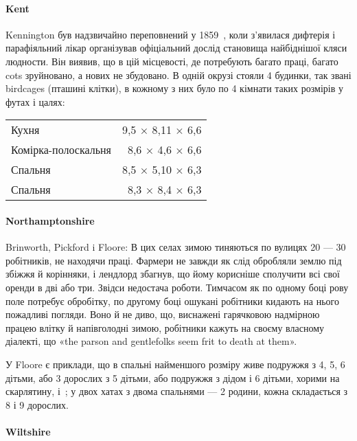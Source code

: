\paragraph{Kent}

Kennington був надзвичайно переповнений у 1859~, коли
з’явилася дифтерія і парафіяльний лікар організував офіціальний
дослід становища найбіднішої кляси людности. Він виявив, що
в цій місцевості, де потребують багато праці, багато cots зруйновано,
а нових не збудовано. В одній окрузі стояли 4 будинки,
так звані birdcages (пташині клітки), в кожному з них було по
4 кімнати таких розмірів у футах і цалях:

\begin{table}[H]
  \centering
  \begin{tabular}{lr}
    Кухня\dotfill{} & 9,5 × 8,11 × 6,6 \\
    Комірка-полоскальня & 8,6 × 4,6\phantom{0} × 6,6 \\
    Спальня\dotfill{}&8,5 × 5,10 × 6,3 \\
    Спальня\dotfill{}&8,3 × 8,4\phantom{0} × 6,3 \\
  \end{tabular}
\end{table}

\paragraph{Northamptonshire}
Brinworth, Pickford i Floore: В цих селах зимою тиняються
по вулицях 20 — 30 робітників, не находячи праці. Фармери не
завжди як слід обробляли землю під збіжжя й корінняки, і лендлорд
збагнув, що йому корисніше сполучити всі свої оренди
в дві або три. Звідси недостача роботи. Тимчасом як по одному
боці рову поле потребує обробітку, по другому боці ошукані
робітники кидають на нього пожадливі погляди. Воно й не диво,
що, виснажені гарячковою надмірною працею влітку й напівголодні
зимою, робітники кажуть на своєму власному діалекті,
що «the parson and gentlefolks seem frit to death at them».

У Floore є приклади, що в спальні найменшого розміру живе
подружжя з 4, 5, 6 дітьми, або 3 дорослих з 5 дітьми, або подружжя
з дідом і 6 дітьми, хорими на скарлятину, і~; у двох
хатах з двома спальнями — 2 родини, кожна складається з 8
і 9 дорослих.

\paragraph{Wiltshire}

